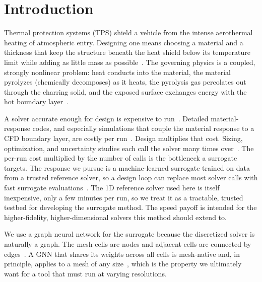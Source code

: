 \documentclass[conference]{IEEEtran}
\begin{document}
\section{Introduction}
Thermal protection systems (TPS) shield a vehicle from the intense aerothermal
heating of atmospheric entry. Designing one means choosing a material and a
thickness that keep the structure beneath the heat shield below its temperature
limit while adding as little mass as possible~\cite{mazzaracchio2010,lu2024}. The
governing physics is a coupled, strongly nonlinear problem: heat conducts into the
material, the material pyrolyzes (chemically decomposes) as it heats, the
pyrolysis gas percolates out through the charring solid, and the exposed surface
exchanges energy with the hot boundary layer~\cite{pan2023,mazzaracchio2010}.

A solver accurate enough for design is expensive to run~\cite{queipo2005}.
Detailed material-response codes, and especially simulations that couple the
material response to a CFD boundary layer, are costly per run~\cite{pan2023}. Design multiplies that cost. Sizing, optimization, and uncertainty studies each
call the solver many times over~\cite{pan2023,mazzaracchio2010,lu2024}. The per-run cost
multiplied by the number of calls is the bottleneck a surrogate targets. The
response we pursue is a machine-learned surrogate trained on data from a trusted
reference solver, so a design loop can replace most solver calls with fast
surrogate evaluations~\cite{queipo2005,kochkov2021,brandstetter2022}. The 1D reference solver used here is
itself inexpensive, only a few minutes per run, so we treat it as a tractable,
trusted testbed for developing the surrogate method. The speed payoff is
intended for the higher-fidelity, higher-dimensional solvers this method should
extend to.

We use a graph neural network for the surrogate because the discretized solver is
naturally a graph. The mesh cells are nodes and adjacent cells are connected by
edges~\cite{sanchez2020learning,meshgraphnets}. A GNN that shares its weights
across all cells is mesh-native and, in principle, applies to a mesh of any
size~\cite{meshgraphnets,brandstetter2022}, which is the property we ultimately want for a
tool that must run at varying resolutions.
\end{document}
